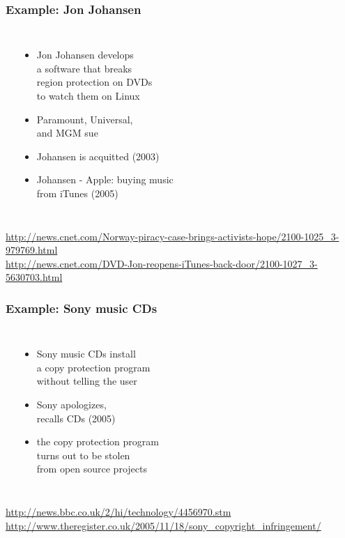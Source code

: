 \documentclass[dvipsnames]{beamer}
\theoremstyle{plain}
\begin{document}
\begin{frame}
  \frametitle{Example: Jon Johansen}

  \begin{columns}
    \begin{center}
    \end{center}

    \begin{itemize}
      \item Jon Johansen develops\\
        a software that breaks\\
        region protection on DVDs\\
        to watch them on Linux
      \item Paramount, Universal,\\
        and MGM sue
      \item Johansen is acquitted (2003)

      \pause
      \medskip
      \item Johansen - Apple: buying music\\
        from iTunes (2005)
    \end{itemize}
  \end{columns}

  \medskip
  \tiny{\url{http://news.cnet.com/Norway-piracy-case-brings-activists-hope/2100-1025_3-979769.html}}\\
  \tiny{\url{http://news.cnet.com/DVD-Jon-reopens-iTunes-back-door/2100-1027_3-5630703.html}}\\
\end{frame}

\begin{frame}
  \frametitle{Example: Sony music CDs}

  \begin{columns}
    \begin{center}
    \end{center}

    \begin{itemize}
      \item Sony music CDs install\\
        a copy protection program\\
        without telling the user
      \item Sony apologizes,\\
        recalls CDs (2005)

      \pause
      \item the copy protection program\\
        turns out to be stolen\\
        from open source projects
    \end{itemize}
  \end{columns}

  \medskip
  \tiny{\url{http://news.bbc.co.uk/2/hi/technology/4456970.stm}}\\
  \tiny{\url{http://www.theregister.co.uk/2005/11/18/sony_copyright_infringement/}}\\
\end{frame}
\end{document}
